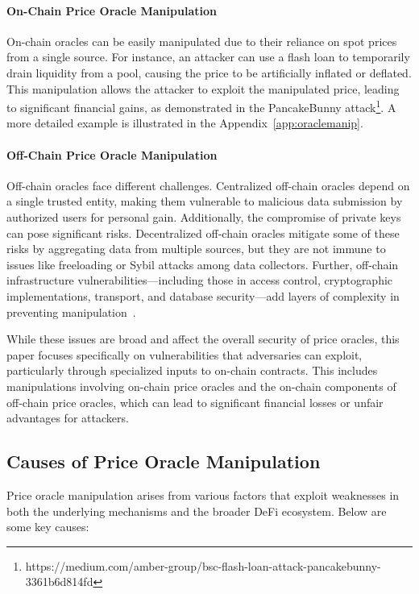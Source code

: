 \paragraph{On-Chain Price Oracle Manipulation}
On-chain oracles can be easily manipulated due to their reliance on spot prices from a single source. For instance, an attacker can use a flash loan to temporarily drain liquidity from a pool, causing the price to be artificially inflated or deflated. This manipulation allows the attacker to exploit the manipulated price, leading to significant financial gains, as demonstrated in the PancakeBunny attack\footnote{https://medium.com/amber-group/bsc-flash-loan-attack-pancakebunny-3361b6d814fd}.
A more detailed example is illustrated in the Appendix~\ref{app:oraclemanip}.

\paragraph{Off-Chain Price Oracle Manipulation}
Off-chain oracles face different challenges. Centralized off-chain oracles depend on a single trusted entity, making them vulnerable to malicious data submission by authorized users for personal gain. Additionally, the compromise of private keys can pose significant risks. Decentralized off-chain oracles mitigate some of these risks by aggregating data from multiple sources, but they are not immune to issues like freeloading or Sybil attacks among data collectors. Further, off-chain infrastructure vulnerabilities—including those in access control, cryptographic implementations, transport, and database security—add layers of complexity in preventing manipulation~\cite{offchainoracle}.

While these issues are broad and affect the overall security of price oracles, this paper focuses specifically on vulnerabilities that adversaries can exploit, particularly through specialized inputs to on-chain contracts. This includes manipulations involving on-chain price oracles and the on-chain components of off-chain price oracles, which can lead to significant financial losses or unfair advantages for attackers.


\subsection{Causes of Price Oracle Manipulation}
Price oracle manipulation arises from various factors that exploit weaknesses in both the underlying mechanisms and the broader DeFi ecosystem. Below are some key causes:

